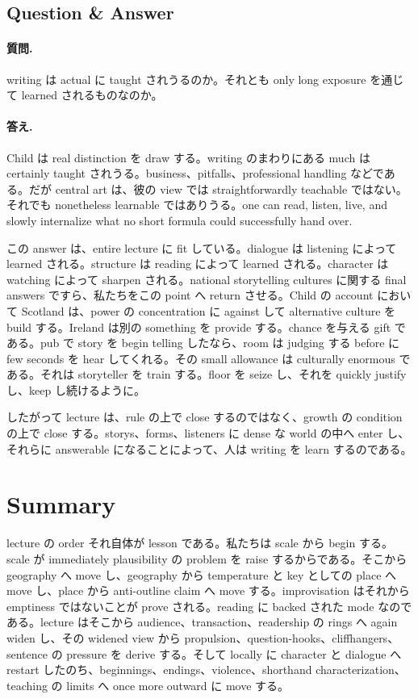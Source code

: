 \subsection{Question \& Answer}

\paragraph{質問.} writing は actual に taught されうるのか。それとも only long exposure を通じて learned されるものなのか。

\paragraph{答え.} Child は real distinction を draw する。writing のまわりにある much は certainly taught されうる。business、pitfalls、professional handling などである。だが central art は、彼の view では straightforwardly teachable ではない。それでも nonetheless learnable ではありうる。one can read, listen, live, and slowly internalize what no short formula could successfully hand over.

この answer は、entire lecture に fit している。dialogue は listening によって learned される。structure は reading によって learned される。character は watching によって sharpen される。national storytelling cultures に関する final answers ですら、私たちをこの point へ return させる。Child の account において Scotland は、power の concentration に against して alternative culture を build する。Ireland は別の something を provide する。chance を与える gift である。pub で story を begin telling したなら、room は judging する before に few seconds を hear してくれる。その small allowance は culturally enormous である。それは storyteller を train する。floor を seize し、それを quickly justify し、keep し続けるように。

したがって lecture は、rule の上で close するのではなく、growth の condition の上で close する。storys、forms、listeners に dense な world の中へ enter し、それらに answerable になることによって、人は writing を learn するのである。

\section{Summary}

lecture の order それ自体が lesson である。私たちは scale から begin する。scale が immediately plausibility の problem を raise するからである。そこから geography へ move し、geography から temperature と key としての place へ move し、place から anti-outline claim へ move する。improvisation はそれから emptiness ではないことが prove される。reading に backed された mode なのである。lecture はそこから audience、transaction、readership の rings へ again widen し、その widened view から propulsion、question-hooks、cliffhangers、sentence の pressure を derive する。そして locally に character と dialogue へ restart したのち、beginnings、endings、violence、shorthand characterization、teaching の limits へ once more outward に move する。

